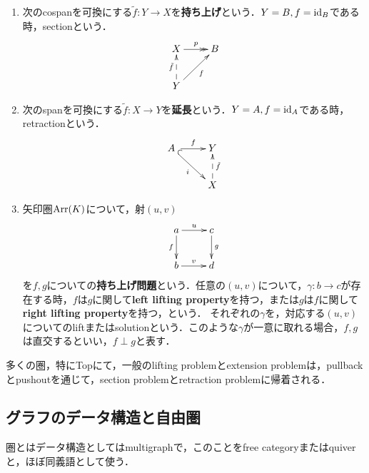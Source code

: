 \documentclass[uplatex,dvipdfmx]{jsreport}
\begin{document}
\begin{definition}
    \begin{enumerate}
        \item 次のcospanを可換にする$\tilde{f}:Y\to X$を\textbf{持ち上げ}という．$Y=B,f=\mathrm{id}_B$である時，sectionという．
        \[\xymatrix{
            X\ar@{->>}[r]^-p&B\\
            Y\ar@{-->}[u]^-{\tilde{f}}\ar[ur]_-f
        }\]
        \item 次のspanを可換にする$\tilde{f}:X\to Y$を\textbf{延長}という．$Y=A,f=\mathrm{id}_A$である時，retractionという．
        \[\xymatrix{
            A\;\ar[r]^-f\ar@{^{(}->}[dr]_-i&Y\\
            &X\ar@{-->}[u]_-{\tilde{f}}
        }\]
        \item 矢印圏$\mathrm{Arr}(K)$について，射$(u,v)$
        \[\xymatrix{
            a\ar[r]^-u\ar[d]_-f&c\ar[d]^-g\\
            b\ar[r]^-v&d
        }\]
        を$f,g$についての\textbf{持ち上げ問題}という．任意の$(u,v)$について，$\gamma:b\to c$が存在する時，$f$は$g$に関して\textbf{left lifting property}を持つ，または$g$は$f$に関して\textbf{right lifting property}を持つ，という．
        それぞれの$\gamma$を，対応する$(u,v)$についてのliftまたはsolutionという．このような$\gamma$が一意に取れる場合，$f,g$は直交するといい，$f\perp g$と表す．
    \end{enumerate}
\end{definition}
\begin{remark}
    多くの圏，特にTopにて，一般のlifting problemとextension problemは，pullbackとpushoutを通じて，section problemとretraction problemに帰着される．
\end{remark}

\subsection{グラフのデータ構造と自由圏}

\begin{tcolorbox}[colframe=ForestGreen, colback=ForestGreen!10!white, breakable ,colbacktitle=ForestGreen!40!white, coltitle=black,fonttitle=\bfseries\sffamily,
    title=コンマ圏とは，fiber積の概念の関手への昇華であり，従ってline graph的概念である]
    圏とはデータ構造としてはmultigraphで，このことをfree categoryまたはquiverと，ほぼ同義語として使う．
\end{tcolorbox}
\end{document}
